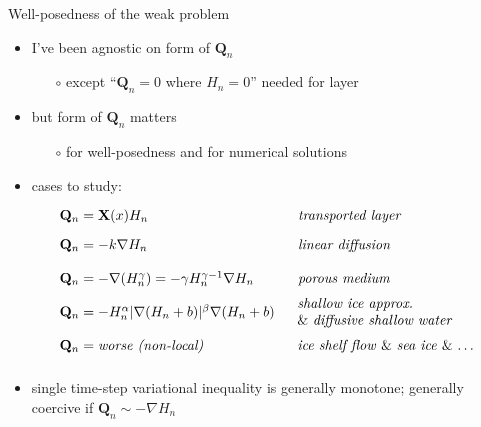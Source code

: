 \documentclass{beamer}
\newcommand\bQ{\mathbf{Q}}
\newcommand\bX{\mathbf{X}}
\newcommand{\grad}{\nabla}
\begin{document}
\begin{frame}{Well-posedness of the weak problem}
\begin{itemize}
\item I've been agnostic on form of $\bQ_n$
  \begin{itemize}
  \item[$\circ$] except ``$\bQ_n=0$ where $H_n=0$'' needed for layer
  \end{itemize}
\item but form of $\bQ_n$ matters
  \begin{itemize}
  \item[$\circ$] for well-posedness and for numerical solutions
  \end{itemize}
\item cases to study:\small
$$\begin{array}{ll}
  \bQ_n = \bX(x) H_n & \text{\phantom{\Big|}\emph{transported layer}} \\
  \bQ_n = -k \grad H_n & \text{\phantom{\bigg|}\emph{linear diffusion}} \\
  \bQ_n = - \grad(H_n^\gamma) = - \gamma H_n^{\gamma-1} \grad H_n
     & \text{\phantom{\Big|}\emph{porous medium}}\phantom{\bigg|} \\
  \bQ_n = - H_n^\alpha |\grad (H_n+b)|^\beta \grad (H_n+b)\phantom{\bigg|} &
        \hspace{-0.75mm}\begin{array}{ll}
        \text{\emph{shallow ice approx.}} \\
        \text{\& \emph{diffusive shallow water}}
        \end{array} \\
  \bQ_n = \text{\emph{worse (non-local)}}\phantom{\bigg|} & \hspace{-0.75mm}\begin{array}{ll}
        \text{\emph{ice shelf flow} \& \emph{sea ice} \& \dots}
        \end{array}
\end{array}$$
\item single time-step variational inequality is generally monotone; generally coercive if $\bQ_n \sim - \grad H_n$
\end{itemize}
\end{frame}
\end{document}
